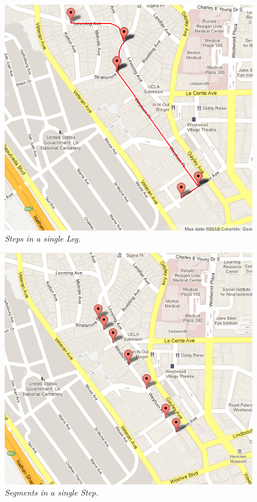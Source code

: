 \documentclass[12pt,fullpage,doublespace]{article}
\begin{document}
\begin{figure}
\begin{center}
\includegraphics[scale=0.35]{stepsInALeg.png}
\caption{\small \sl Steps in a single Leg.\label{fig:stepsInALeg}}
\end{center}
\end{figure}
\begin{figure}
\begin{center}
\includegraphics[scale=0.35]{segmentsInAStep.png}
\caption{\small \sl Segments in a single Step.\label{fig:segmentsInAStep}}
\end{center}
\end{figure}
\end{document}

